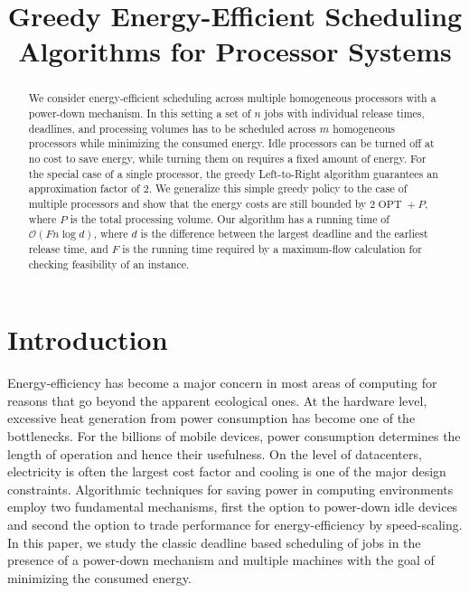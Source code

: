 \documentclass[a4paper]{article}
\title{Greedy Energy-Efficient Scheduling Algorithms for Processor Systems}
\DeclareMathOperator{\OPT}{OPT}
\begin{document}
%

\begin{abstract}
  We consider energy-efficient scheduling across multiple homogeneous processors with a power-down mechanism.
  In this setting a set of $n$ jobs with individual release times, deadlines, and processing volumes has to be scheduled across $m$ homogeneous processors while minimizing the consumed energy.
  Idle processors can be turned off at no cost to save energy, while turning them on requires a fixed amount of energy.
  For the special case of a single processor, the greedy Left-to-Right algorithm guarantees an approximation factor of $2$.
  We generalize this simple greedy policy to the case of multiple processors and show that the energy costs are still bounded by $2 \OPT + P$, where $P$ is the total processing volume.
  Our algorithm has a running time of $\mathcal{O}(F n \log d)$, where $d$ is the difference between the largest deadline and the earliest release time, and $F$ is the running time required by a maximum-flow calculation for checking feasibility of an instance.
\end{abstract}


\section{Introduction}
Energy-efficiency has become a major concern in most areas of computing for reasons that go beyond the apparent ecological ones.
At the hardware level, excessive heat generation from power consumption has become one of the bottlenecks.
For the billions of mobile devices, power consumption determines the length of operation and hence their usefulness.
On the level of datacenters, electricity is often the largest cost factor and cooling is one of the major design constraints.
Algorithmic techniques for saving power in computing environments employ two fundamental mechanisms, first the option to power-down idle devices and second the option to trade performance for energy-efficiency by speed-scaling.
In this paper, we study the classic deadline based scheduling of jobs in the presence of a power-down mechanism and multiple machines with the goal of minimizing the consumed energy.
\end{document}
